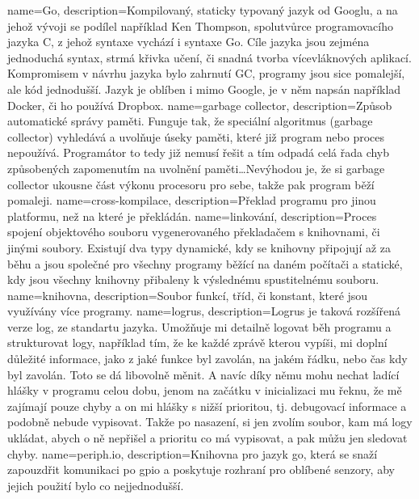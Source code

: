 {
  name={Go},
  description={Kompilovaný, staticky typovaný jazyk od Googlu, a na jehož vývoji se podílel například Ken Thompson, 
spolutvůrce programovacího jazyka C, z jehož syntaxe vychází i syntaxe Go. Cíle jazyka jsou zejména jednoduchá syntax, 
strmá křivka učení, či snadná tvorba vícevláknových aplikací. Kompromisem v návrhu jazyka bylo zahrnutí \gls{GC}, 
programy jsou sice pomalejší, ale kód jednodušší. Jazyk je oblíben i mimo Google, je v něm napsán například Docker, či 
ho používá Dropbox.}
}
{
  name={garbage collector},
  description={Způsob automatické správy paměti. Funguje tak, že speciální algoritmus (garbage collector) vyhledává 
a uvolňuje úseky paměti, které již program nebo proces nepoužívá. Programátor to tedy již nemusí řešit a tím odpadá celá 
řada chyb způsobených zapomenutím na uvolnění paměti\ldots Nevýhodou je, že si garbage collector ukousne část výkonu 
procesoru pro sebe, takže pak program běží pomaleji.}
}
{
  name={cross-kompilace},
  description={Překlad programu pro jinou platformu, než na které je překládán.}
}
{
  name={linkování},
  description={Proces spojení objektového souboru vygenerovaného překladačem s knihovnami, či jinými soubory. Existují 
dva typy dynamické, kdy se knihovny připojují až za běhu a jsou společné pro všechny programy běžící na daném počítači 
a statické, kdy jsou všechny knihovny přibaleny k výslednému spustitelnému souboru.}
}
{
  name={knihovna},
  description={Soubor funkcí, tříd, či konstant, které jsou využívány více programy.}
}
{
  name={logrus},
  description={Logrus je taková rozšířená verze  log, ze standartu jazyka. Umožňuje mi 
detailně logovat běh programu a strukturovat logy, například tím, že ke každé zprávě kterou vypíši, mi doplní důležité 
informace, jako z jaké funkce byl zavolán, na jakém řádku, nebo čas kdy byl zavolán. Toto se dá libovolně měnit. A navíc 
díky němu mohu nechat ladící hlášky v programu celou dobu, jenom na začátku v inicializaci mu řeknu, že mě zajímají 
pouze chyby a on mi hlášky s nižší prioritou, tj. debugovací informace a podobně nebude vypisovat. Takže po nasazení, si 
jen zvolím soubor, kam má logy ukládat, abych o ně nepřišel a prioritu co má vypisovat, a pak můžu jen sledovat chyby.}
}
{
  name={periph.io},
  description={Knihovna pro jazyk \gls{go}, která se snaží zapouzdřit komunikaci po \acrshort{gpio} a poskytuje rozhraní 
pro oblíbené senzory, aby jejich použití bylo co nejjednodušší.}
}
